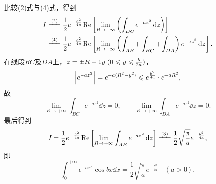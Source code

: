 \begin{example}
\begin{solution}
比较(2)式与(4)式，得到\[
\begin{split}
I &\xlongequal{\rm(2)} \frac{1}{2} e^{-\frac{b^2}{4a}} \Re\left[\lim\limits_{R\to+\infty} \left( \int_{DC} e^{-az^2} \dd{z} \right)\right] \\
&\xlongequal{\rm(4)} \frac{1}{2} e^{-\frac{b^2}{4a}} \Re\left[\lim\limits_{R\to+\infty} \left( \int_{AB} + \int_{BC} + \int_{DA}\right) e^{-az^2} \dd{z}\right].
\end{split}
\]
在线段\(BC\)及\(DA\)上，\(z=\pm R+\kern1pt\mathrm{i}\kern1pt y\ (0 \leqslant y \leqslant \frac{b}{2a})\)，\[
\abs{e^{-az^2}}
= e^{-a(R^2-y^2)}
\leqslant e^{\frac{b^2}{4a}} \cdot e^{-aR^2},
\]故\[
\lim\limits_{R\to+\infty} \int_{BC} e^{-az^2} \dd{z} = 0,
\qquad
\lim\limits_{R\to+\infty} \int_{DA} e^{-az^2} \dd{z} = 0.
\]最后得到\[
I = \frac{1}{2} e^{-\frac{b^2}{4a}} \Re\left[ \lim\limits_{R\to+\infty} \int_{AB} e^{-az^2} \dd{z} \right]
\xlongequal{\rm(3)} \frac{1}{2} \sqrt{\frac{\pi}{a}} e^{-\frac{b^2}{4a}},
\]即\begin{equation}\label{equation:留数定理.泊松积分}
\int_0^{+\infty} e^{-ax^2} \cos bx \dd{x}
= \frac{1}{2} \sqrt{\frac{\pi}{a}} e^{-\frac{b^2}{4a}}
\quad(a>0).
\end{equation}
\end{solution}
\end{example}

